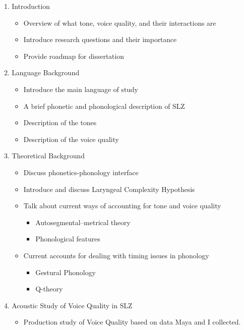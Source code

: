 \documentclass[12pt, letterpaper]{article}
\begin{document}
\begin{enumerate}
    \item Introduction
    \begin{itemize}
        \item Overview of what tone, voice quality, and their interactions are
        \item Introduce research questions and their importance
        \item Provide roadmap for dissertation
    \end{itemize}
    \item Language Background
    \begin{itemize}
        \item Introduce the main language of study
        \item A brief phonetic and phonological description of SLZ
        \item Description of the tones
        \item Description of the voice quality
    \end{itemize}
    \item Theoretical Background
    \begin{itemize}
        \item Discuss phonetics-phonology interface
        \item Introduce and discuss Laryngeal Complexity Hypothesis
        \item Talk about current ways of accounting for tone and voice quality 
        \begin{itemize}
            \item Autosegmental–metrical theory 
            \item Phonological features
        \end{itemize}
        \item Current accounts for dealing with timing issues in phonology
        \begin{itemize}
            \item Gestural Phonology
            \item Q-theory
        \end{itemize}
    \end{itemize}
    \item Acoustic Study of Voice Quality in SLZ
    \begin{itemize}
        \item Production study of Voice Quality based on data Maya and I collected. 
        \begin{itemize}

\end{itemize}
\end{itemize}
\end{enumerate}
\end{document}
